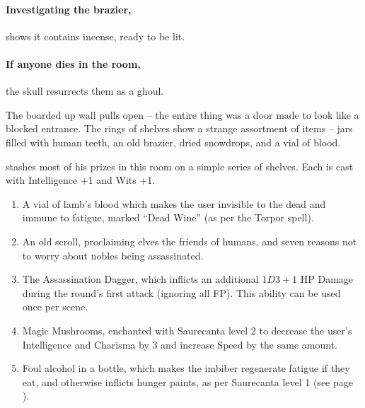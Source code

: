\begin{multicols}{2}
\begin{boxtext}
\end{boxtext}

\paragraph{Investigating the brazier,}
shows it contains incense, ready to be lit.

\paragraph{If anyone dies in the room,}
the skull resurrects them as a ghoul.



\begin{boxtext}

  The boarded up wall pulls open -- the entire thing was a door made to look like a blocked entrance.  The rings of shelves show a strange assortment of items -- jars filled with human teeth, an old brazier, dried snowdrops, and a vial of blood.

\end{boxtext}

 stashes most of his prizes in this room on a simple series of shelves.
Each is cast with Intelligence +1 and Wits +1.

\begin{enumerate}

  \item
  A vial of lamb's blood which makes the user invisible to the dead and immune to fatigue, marked ``Dead Wine'' (as per the Torpor spell).
  \item
  An old scroll, proclaiming elves the friends of humans, and seven reasons not to worry about nobles being assassinated.
  \item
  The Assassination Dagger, which inflicts an additional $1D3+1$ HP Damage during the round's first attack (ignoring all FP).
  This ability can be used once per scene.
  \item
  Magic Mushrooms, enchanted with Saurecanta level 2 to decrease the user's Intelligence and Charisma by 3 and increase Speed by the same amount.
  \item
  Foul alcohol in a bottle, which makes the imbiber regenerate fatigue if they eat, and otherwise inflicts hunger paints, as per Saurecanta level 1 (see page \pageref{saurecantaone}).
\end{enumerate}


\end{multicols}

